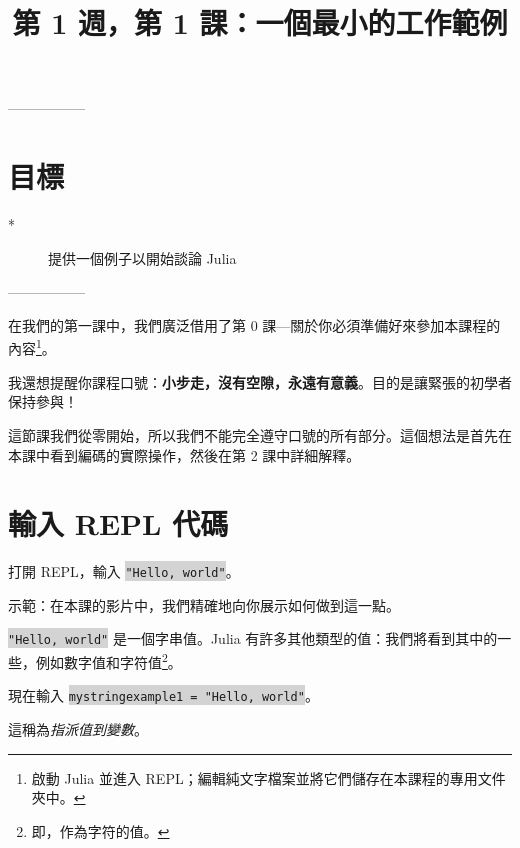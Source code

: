 \documentclass[]{article}
\begin{document}
\author{}  \date{}
\title{第 1 週，第 1 課：一個最小的工作範例}
\maketitle

\vspace*{-2cm}
-----------------

\section*{目標}
\begin{description}
	\item[*] 提供一個例子以開始談論 Julia
\end{description}

-----------------

在我們的第一課中，我們廣泛借用了第 0 課---關於你必須準備好來參加本課程的內容\footnote{啟動 Julia 並進入 REPL；編輯純文字檔案並將它們儲存在本課程的專用文件夾中。}。

我還想提醒你課程口號：{\bf 小步走，沒有空隙，永遠有意義}。目的是讓緊張的初學者保持參與！

這節課我們從零開始，所以我們不能完全遵守口號的所有部分。這個想法是首先在本課中看到編碼的實際操作，然後在第 2 課中詳細解釋。

\section*{輸入 REPL 代碼}

\begin{minipage}{7cm}
打開 REPL，輸入 \colorbox{lightgray}{\tt "Hello, world"}。
\end{minipage}
\hspace{4em}\begin{minipage}{7cm}
	 示範：在本課的影片中，我們精確地向你展示如何做到這一點。
 \end{minipage}

\colorbox{lightgray}{\tt "Hello, world"} 是一個字串值。Julia 有許多其他類型的值：我們將看到其中的一些，例如數字值和字符值\footnote{即，作為字符的值。}。

\begin{minipage}{7cm}
現在輸入 \colorbox{lightgray}{\tt mystringexample1 = "Hello, world"}。
\end{minipage}
\hspace{4em} \begin{minipage}{7cm}
這稱為\emph{指派值到變數}。
\end{minipage}
\end{document}
